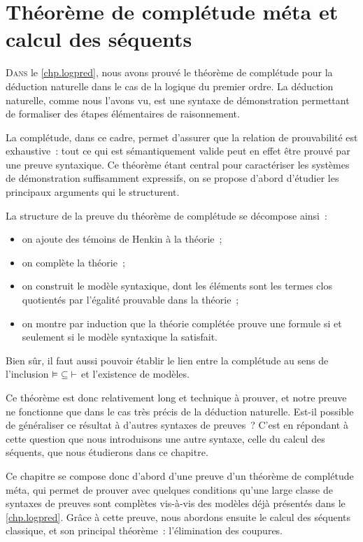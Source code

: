 \chapter[Calcul des séquents]{Théorème de complétude méta et
  calcul des séquents}\label{chp.sequents}

\minitoc

\lettrine{D}{ans} le \cref{chp.logpred}, nous avons prouvé le théorème de
complétude pour la déduction naturelle dans le cas de la logique du premier
ordre. La déduction naturelle, comme nous l'avons vu, est une syntaxe de
démonstration permettant de formaliser des étapes élémentaires de raisonnement.

La complétude, dans ce cadre, permet d'assurer que la relation de
prouvabilité est exhaustive~: tout ce qui est sémantiquement valide peut en
effet être prouvé par une preuve syntaxique. Ce théorème étant central pour
caractériser les systèmes de démonstration suffisamment expressifs, on se
propose d'abord d'étudier les principaux arguments qui le structurent.

La structure de la preuve du théorème de complétude se décompose ainsi~:
\begin{itemize}
\item on ajoute des témoins de Henkin à la théorie~;
\item on complète la théorie~;
\item on construit le modèle syntaxique, dont les éléments sont les termes clos
  quotientés par l'égalité prouvable dans la théorie~;
\item on montre par induction que la théorie complétée prouve une formule si et
  seulement si le modèle syntaxique la satisfait.
\end{itemize}
Bien sûr, il faut aussi pouvoir établir le lien entre la complétude au sens
de l'inclusion $\mathord{\vDash}\subseteq\mathord{\vdash}$ et l'existence de
modèles.

Ce théorème est donc relativement long et technique à prouver, et notre preuve
ne fonctionne que dans le cas très précis de la déduction naturelle. Est-il
possible de généraliser ce résultat à d'autres syntaxes de preuves~? C'est en
répondant à cette question que nous introduisons une autre syntaxe, celle du
calcul des séquents, que nous étudierons dans ce chapitre.

Ce chapitre se compose donc d'abord d'une preuve d'un théorème de complétude
\og méta\fg, qui permet de prouver avec quelques conditions qu'une large classe
de syntaxes de preuves sont complètes vis-à-vis des modèles déjà présentés dans
le \cref{chp.logpred}. Grâce à cette preuve, nous abordons ensuite le calcul des
séquents classique, et son principal théorème~: l'élimination des coupures.

